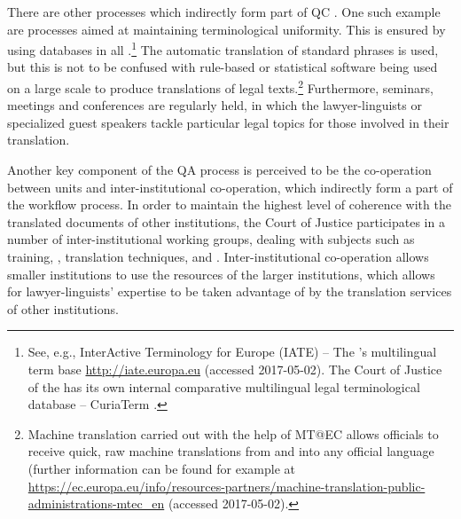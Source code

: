 \documentclass[output=paper]{langsci/langscibook}
\begin{document}
There are other processes which indirectly form part of QC \citep{Izzo2014b}. One such example are processes aimed at maintaining terminological uniformity. This is ensured by using  databases in all .\footnote{See, e.g., InterActive Terminology for Europe (IATE) – The ’s multilingual term base \url{http://iate.europa.eu} (accessed 2017-05-02). The Court of Justice of the  has its own internal comparative multilingual legal terminological database – CuriaTerm \citep[259]{Künnecke2013}.} The automatic translation of standard phrases is used, but this is not to be confused with rule-based or statistical  software being used on a large scale to produce translations of legal texts.\footnote{Machine translation carried out with the help of MT@EC allows  officials to receive quick, raw machine translations from and into any official  language (further information can be found for example at \url{https://ec.europa.eu/info/resources-partners/machine-translation-public-administrations-mtec_en} (accessed 2017-05-02).} Furthermore, seminars, meetings and conferences are regularly held, in which the lawyer-linguists or specialized guest speakers tackle particular legal topics for those involved in their translation.

\largerpage
Another key component of the QA process is perceived to be the co-operation between units and inter-institutional co-operation, which indirectly form a part of the workflow process. In order to maintain the highest level of coherence with the translated documents of other  institutions, the Court of Justice participates in a number of inter-institutional working groups, dealing with subjects such as training, , translation techniques, and . Inter-institutional co-operation allows smaller institutions to use the resources of the larger institutions, which allows for lawyer-linguists’ expertise to be taken advantage of by the translation services of other  institutions.
\end{document}

